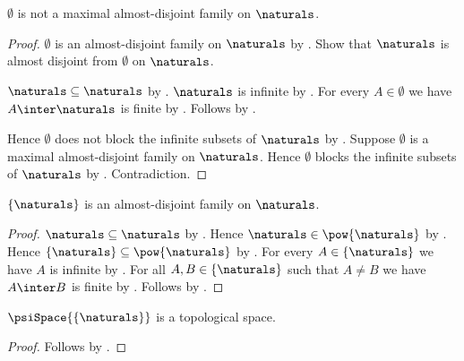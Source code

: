 \begin{proposition}\label{empty_almost_disjoint_family_is_not_maximal}
    $\emptyset$ is not a maximal almost-disjoint family on
        $\naturals$.
\end{proposition}
\begin{proof}
    $\emptyset$ is an almost-disjoint family on $\naturals$ by
        .
    Show that $\naturals$ is almost disjoint from $\emptyset$ on
        $\naturals$.
    \begin{subproof}
        $\naturals\subseteq\naturals$ by .
        $\naturals$ is infinite by .
        For every $A\in\emptyset$ we have $A\inter\naturals$ is finite
            by .
        Follows by .
    \end{subproof}
    Hence $\emptyset$ does not block the infinite subsets of $\naturals$
        by .
    Suppose $\emptyset$ is a maximal almost-disjoint family on
        $\naturals$.
    Hence $\emptyset$ blocks the infinite subsets of $\naturals$ by
        .
    Contradiction.
\end{proof}

\begin{proposition}\label{singleton_naturals_is_almost_disjoint_family}
    $\{\naturals\}$ is an almost-disjoint family on $\naturals$.
\end{proposition}
\begin{proof}
    $\naturals\subseteq\naturals$ by .
    Hence $\naturals\in\pow{\naturals}$ by .
    Hence $\{\naturals\}\subseteq\pow{\naturals}$ by
        .
    For every $A\in\{\naturals\}$ we have $A$ is infinite by
        .
    For all $A,B\in\{\naturals\}$ such that $A\neq B$ we have
        $A\inter B$ is finite by .
    Follows by .
\end{proof}

\begin{theorem}\label{singleton_naturals_psi_space_is_topological_space}
    $\psiSpace{\{\naturals\}}$ is a topological space.
\end{theorem}
\begin{proof}
    Follows by
        .
\end{proof}

